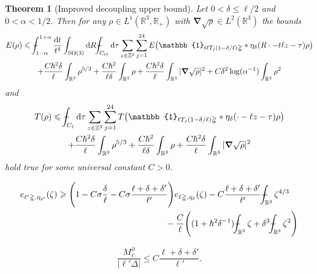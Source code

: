 \documentclass[10pt,a4paper]{amsart}
\newtheorem{theorem}{Theorem}
\newcommand{\RR}{\mathbb{R}}
\newcommand{\SO}{\mathrm{SO}}
\def\XXint#1#2#3{{\setbox0=\hbox{$#1{#2#3}{\int}$ }
\vcenter{\hbox{$#2#3$ }}\kern-.6\wd0}}
\def\Xint#1{\mathchoice
{\XXint\displaystyle\textstyle{#1}}%
{\XXint\textstyle\scriptstyle{#1}}%
{\XXint\scriptstyle\scriptscriptstyle{#1}}%
{\XXint\scriptscriptstyle\scriptscriptstyle{#1}}%
\!\int}
\newcommand{\ZZ}{\mathbb{Z}}
\def\dashint{\Xint-}
\newcommand{\dd}{\mathrm{d}} %
\renewcommand{\ge}{\geqslant}
\newcommand{\grad}{\bm{\nabla}} %
\newcommand{\iden}{\mathbb{1}} %
\renewcommand{\le}{\leqslant}
\newcommand{\tetra}{\mathbb{\Delta}} %
\begin{document}
\begin{theorem}[Improved decoupling upper bound]\label{impdecup}
Let $0<\delta\le \ell/2$ and $0<\alpha<1/2$. Then for any $\rho\in L^1(\RR^3,\RR_+)$ with $\grad\sqrt{\rho}\in L^2(\RR^3)$ the bounds
\begin{multline*}
E(\rho)\le  \dashint_{1-\alpha}^{1+\alpha}\frac{\dd t}{t^4} \int_{\SO(3)}\dd R \dashint_{C_{t\ell}}\dd\tau \sum_{z\in\ZZ^3}  \sum_{j=1}^{24} 
E\bigl(\iden_{t\ell T_j(1-\delta/\ell)\tetra} * \eta_\delta(R\cdot - t\ell z - \tau)\rho\bigr)\\
+\frac{C\hbar^2\delta}{\ell} \int_{\RR^3}\rho^{5/3} +  \frac{C\hbar^2}{\ell\delta} \int_{\RR^3} \rho + \frac{C\hbar^2\delta}{\ell}\int_{\RR^3} |\grad\sqrt{\rho}|^2
+C\delta^2\log(\alpha^{-1}) \int_{\RR^3} \rho^2
\end{multline*}
and 
\begin{multline*}
T(\rho)\le \dashint_{C_{\ell}}\dd\tau \sum_{z\in\ZZ^3}  \sum_{j=1}^{24} T\bigl(\iden_{\ell T_j(1-\delta/\ell)\tetra} * \eta_\delta(\cdot - \ell z - \tau)\rho\bigr)\\
+\frac{C\hbar^2\delta}{\ell} \int_{\RR^3}\rho^{5/3} +  \frac{C\hbar^2}{\ell\delta} \int_{\RR^3} \rho + \frac{C\hbar^2\delta}{\ell}\int_{\RR^3} |\grad\sqrt{\rho}|^2
\end{multline*}
hold true for some universal constant $C>0$.
\end{theorem}

\begin{equation}\label{tetracomp}
\begin{multlined}
e_{\ell'\tetra,\eta_{\delta'}}(\zeta)\ge \Bigg( 1-C\sigma \frac{\delta}{\ell} -C\sigma\frac{\ell+\delta+\delta'}{\ell'}\Bigg) e_{\ell\tetra,\eta_{\delta}}(\zeta)
- C \frac{\ell+\delta+\delta'}{\ell'} \dashint_{\RR^3} \zeta^{4/3}\\
-\frac{C}{\ell}\Bigg( (1+\hbar^2\delta^{-1}) \dashint_{\RR^3} \zeta + \delta^3\dashint_{\RR^3} \zeta^2 \Bigg)
\end{multlined}
\end{equation}

\begin{equation}\label{volbdbound}
\frac{M_\ell^\partial}{|\ell'\tetra|}\le C \frac{\ell+\delta+\delta'}{\ell'}.
\end{equation}
\end{document}
